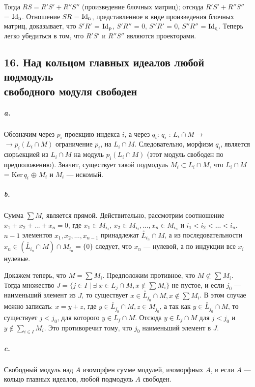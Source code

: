 {\noindent Тогда $RS = R'S' + R''S''$ (произведение блочных матриц); отсюда
$R'S' + R''S''$ = $\rm{Id}_{n}$. Отношение $SR$ = $\rm{Id}_{n}$, представленное в виде произведения блочных матриц, доказывает, что $S'R'$ = $\rm{Id}_{p}$, $S'R''$ = 0,
$S''R'$ = 0, $S''R''$ = $\rm{Id}_{q}$. Теперь легко убедиться в том, что $R'S'$ и $R''S''$
являются проекторами.

\subsection{\normalsize{16. Над кольцом главных идеалов любой подмодуль\\
свободного модуля свободен}}

\subparagraph{a.} Обозначим через $p_{i}$ проекцию индекса $i$, а через $q_{i}$: $q_{i}$ : $L_{i} \cap M \rightarrow$
$\rightarrow p_{i}(L_{i} \cap M)$ ограничение $p_i$, на $L_{i} \cap M$. Следовательно, морфизм $q_{i}$, является сюръекцией из $L_{i} \cap M$ на модуль $p_{i}(L_{i} \cap M)$ (этот модуль свободен
по предположению). Значит, существует такой подмодуль $M_{i} \subset L_{i} \cap M$,
что $L_{i} \cap M$ = Ker{$\,q_{i}$} $\oplus\;M_{i}$ и $M_{i}$ — искомый.

\subparagraph{b.} Сумма $\sum M_{i}$ является прямой. Действительно, рассмотрим соотношение $x_{1} + x_2 +\dots+ x_n = 0$, где $x_{1} \in M_{i_1}$, $x_2 \in M_{i_2},\ldots,x_n \in M_{i_n}$ и
$i_1 < i_2 <\ldots< i_n$. $n - 1$ элементов $x_1, x_2,\ldots, x_{n-1}$ принадлежат $\overset{\circ}{L}_{i_n} \cap M$,
а из последовательности $x_n \in (\overset{\circ}{L}_{i_n} \cap M) \cap M_{i_n} = \{0\}$ следует, что $x_n$ ---
нулевой, а по индукции все $x_i$ нулевые.

Докажем теперь, что $M = \sum M_i$. Предположим противное, что
$M \not\subset \sum M_i$. Тогда множество $J = \{j \in I\;|\;\exists\;x \in L_j \cap M, x \notin \sum M_i\}$
не пустое, и если $j_0$ — наименьший элемент из $J$, то существует
$x \in \overset{\circ}{L}_{j_0} \cap M, x \notin \sum M_i$. В этом случае можно записать: $x = y + z$,
где $y \in \overset{\circ}{L}_{j_0} \cap M, z \in M_{j_0}$, а так как $y \in \overset{\circ}{L}_{j_0} \cap M$, то существует $j < j_0$,
для которого $y \in L_j \cap M$. Отсюда $y \in L_j \cap M$ для $j < j_0$ и $y \notin \sum_{i \in I} M_i$.
Это противоречит тому, что $j_0$ наименьший элемент в $J$.

\subparagraph{c.} Свободный модуль над $A$ изоморфен сумме модулей, изоморфных
$A$, и если $A$ — кольцо главных идеалов, любой подмодуль $A$ свободен.

}
